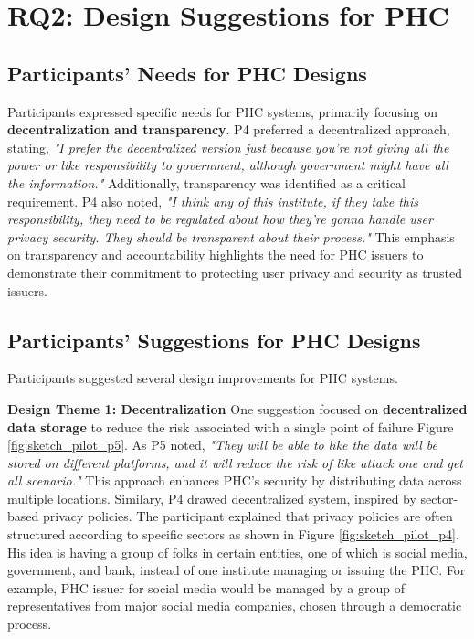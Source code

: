 \section{RQ2: Design Suggestions for PHC}

\subsection{Participants' Needs for PHC Designs}
Participants expressed specific needs for PHC systems, primarily focusing on \textbf{decentralization and transparency}. P4 preferred a decentralized approach, stating, \textit{"I prefer the decentralized version just because you’re not giving all the power or like responsibility to government, although government might have all the information."} Additionally, transparency was identified as a critical requirement. P4 also noted, \textit{"I think any of this institute, if they take this responsibility, they need to be regulated about how they’re gonna handle user privacy security. They should be transparent about their process."} This emphasis on transparency and accountability highlights the need for PHC issuers to demonstrate their commitment to protecting user privacy and security as trusted issuers.

\subsection{Participants' Suggestions for PHC Designs}
Participants suggested several design improvements for PHC systems. 

\textbf{Design Theme 1: Decentralization} One suggestion focused on \textbf{decentralized data storage} to reduce the risk associated with a single point of failure Figure \ref{fig:sketch_pilot_p5}. As P5 noted, \textit{"They will be able to like the data will be stored on different platforms, and it will reduce the risk of like attack one and get all scenario." } This approach enhances PHC's security by distributing data across multiple locations. Similary, P4 drawed decentralized system, inspired by sector-based privacy policies. The participant explained that privacy policies are often structured according to specific sectors as shown in Figure \ref{fig:sketch_pilot_p4}. His idea is having a group of folks in certain entities, one of which is social media, government, and bank, instead of one institute managing or issuing the PHC. For example, PHC issuer for social media would be managed by a group of representatives from major social media companies, chosen through a democratic process.

